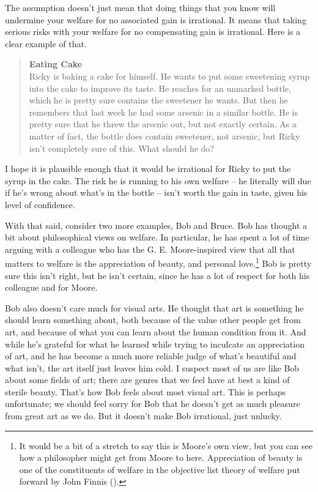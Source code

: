 \documentclass[
  10pt,
  letterpaper,
  DIV=11,
  numbers=noendperiod,
  twoside]{scrartcl}
\begin{document}
The assumption doesn't just mean that doing things that you know will
undermine your welfare for no associated gain is irrational. It means
that taking serious risks with your welfare for no compensating gain is
irrational. Here is a clear example of that.

\begin{quote}
\textbf{Eating Cake}\\
Ricky is baking a cake for himself. He wants to put some sweetening
syrup into the cake to improve its taste. He reaches for an unmarked
bottle, which he is pretty sure contains the sweetener he wants. But
then he remembers that last week he had some arsenic in a similar
bottle. He is pretty sure that he threw the arsenic out, but not exactly
certain. As a matter of fact, the bottle does contain sweetener, not
arsenic, but Ricky isn't completely sure of this. What should he do?
\end{quote}

I hope it is plausible enough that it would be irrational for Ricky to
put the syrup in the cake. The risk he is running to his own welfare --
he literally will due if he's wrong about what's in the bottle -- isn't
worth the gain in taste, given his level of confidence.

With that said, consider two more examples, Bob and Bruce. Bob has
thought a bit about philosophical views on welfare. In particular, he
has spent a lot of time arguing with a colleague who has the G. E.
Moore-inspired view that all that matters to welfare is the appreciation
of beauty, and personal love.\footnote{It would be a bit of a stretch to
  say this is Moore's own view, but you can see how a philosopher might
  get from Moore to here. Appreciation of beauty is one of the
  constituents of welfare in the objective list theory of welfare put
  forward by John Finnis ().} Bob
is pretty sure this isn't right, but he isn't certain, since he has a
lot of respect for both his colleague and for Moore.

Bob also doesn't care much for visual arts. He thought that art is
something he should learn something about, both because of the value
other people get from art, and because of what you can learn about the
human condition from it. And while he's grateful for what he learned
while trying to inculcate an appreciation of art, and he has become a
much more reliable judge of what's beautiful and what isn't, the art
itself just leaves him cold. I suspect most of us are like Bob about
some fields of art; there are genres that we feel have at best a kind of
sterile beauty. That's how Bob feels about most visual art. This is
perhaps unfortunate; we should feel sorry for Bob that he doesn't get as
much pleasure from great art as we do. But it doesn't make Bob
irrational, just unlucky.
\end{document}
